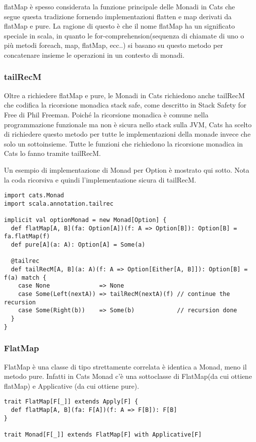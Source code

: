 \noindent flatMap è spesso considerata la funzione principale delle Monadi in Cats che segue questa tradizione fornendo implementazioni flatten e map derivati da flatMap e pure. La ragione di questo è che il nome flatMap ha un significato speciale in scala, in quanto le for-comprehension(sequenza di chiamate di uno o più metodi foreach, map, flatMap, ecc..) si basano su questo metodo per concatenare insieme le operazioni in un contesto di monadi.

\subsubsection{tailRecM}
Oltre a richiedere flatMap e pure, le Monadi in Cats richiedono anche tailRecM che codifica la ricorsione monadica stack safe, come descritto in Stack Safety for Free di Phil Freeman. Poiché la ricorsione monadica è comune nella programmazione funzionale ma non è sicura nello stack sulla JVM, Cats ha scelto di richiedere questo metodo per tutte le implementazioni della monade invece che solo un sottoinsieme. Tutte le funzioni che richiedono la ricorsione monadica in Cats lo fanno tramite tailRecM.

Un esempio di implementazione di Monad per Option è mostrato qui sotto. Nota la coda ricorsiva e quindi l'implementazione sicura di tailRecM.
\begin{verbatim}
import cats.Monad
import scala.annotation.tailrec

implicit val optionMonad = new Monad[Option] {
  def flatMap[A, B](fa: Option[A])(f: A => Option[B]): Option[B] = fa.flatMap(f)
  def pure[A](a: A): Option[A] = Some(a)

  @tailrec
  def tailRecM[A, B](a: A)(f: A => Option[Either[A, B]]): Option[B] = f(a) match {
    case None              => None
    case Some(Left(nextA)) => tailRecM(nextA)(f) // continue the recursion
    case Some(Right(b))    => Some(b)            // recursion done
  }
}
\end{verbatim}

\subsubsection{FlatMap}

FlatMap è una classe di tipo strettamente correlata è identica a Monad, meno il metodo pure. Infatti in Cats Monad c'è una sottoclasse di FlatMap(da cui ottiene flatMap) e Applicative (da cui ottiene pure).
\begin{verbatim}
trait FlatMap[F[_]] extends Apply[F] {
  def flatMap[A, B](fa: F[A])(f: A => F[B]): F[B]
}

trait Monad[F[_]] extends FlatMap[F] with Applicative[F]
\end{verbatim}

